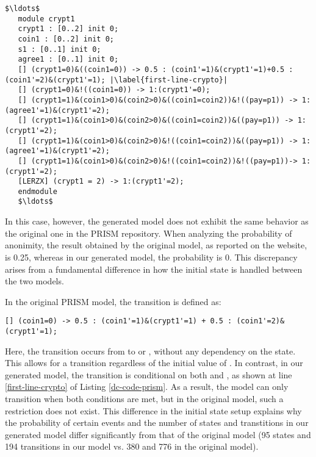 \begin{lstlisting}[style=prism-color,caption={Part of the generated PRISM model for the Dining Cryptographers Protocol},captionpos=b,label={dc-code-prism},escapechar=|]
   $\ldots$
   module crypt1
   crypt1 : [0..2] init 0;
   coin1 : [0..2] init 0;
   s1 : [0..1] init 0;
   agree1 : [0..1] init 0;
   [] (crypt1=0)&((coin1=0)) -> 0.5 : (coin1'=1)&(crypt1'=1)+0.5 : (coin1'=2)&(crypt1'=1); |\label{first-line-crypto}|
   [] (crypt1=0)&!((coin1=0)) -> 1:(crypt1'=0);
   [] (crypt1=1)&(coin1>0)&(coin2>0)&((coin1=coin2))&!((pay=p1)) -> 1:(agree1'=1)&(crypt1'=2);
   [] (crypt1=1)&(coin1>0)&(coin2>0)&((coin1=coin2))&((pay=p1)) -> 1:(crypt1'=2);
   [] (crypt1=1)&(coin1>0)&(coin2>0)&!((coin1=coin2))&((pay=p1)) -> 1:(agree1'=1)&(crypt1'=2);
   [] (crypt1=1)&(coin1>0)&(coin2>0)&!((coin1=coin2))&!((pay=p1))-> 1:(crypt1'=2);
   [LERZX] (crypt1 = 2) -> 1:(crypt1'=2);
   endmodule
   $\ldots$
\end{lstlisting}

In this case, however, the generated model does not exhibit the same behavior as the original one in the PRISM repository. When analyzing the probability of anonimity, the result obtained by the original model, as reported on the website, is 0.25, whereas in our generated model, the probability is 0. This discrepancy arises from a fundamental difference in how the initial state is handled between the two models.

In the original PRISM model, the transition is defined as:
\begin{lstlisting}[style=prism-color, frame=none, numbers=none]
   [] (coin1=0) -> 0.5 : (coin1'=1)&(crypt1'=1) + 0.5 : (coin1'=2)&(crypt1'=1);
   \end{lstlisting}
Here, the transition occurs from  to  or , without any dependency on the  state. This allows for a transition regardless of the initial value of .
In contrast, in our generated model, the transition is conditional on both  and , as shown at line \ref{first-line-crypto} of Listing \ref{dc-code-prism}.
As a result, the model can only transition when both conditions are met, but in the original model, such a restriction does not exist. This difference in the initial state setup explains why the probability of certain events and the number of states and transtitions in our generated model differ significantly from that of the original model (95 states and 194 transitions in our model vs. 380 and 776 in the original model).

